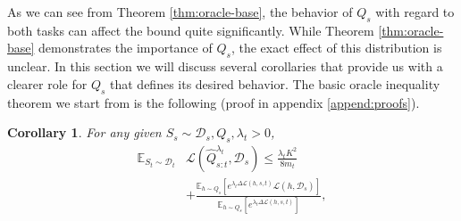 \documentclass{article}
\theoremstyle{plain}
\newtheorem{corollary}[theorem]{Corollary}
\theoremstyle{definition}
\theoremstyle{remark}
\begin{document}
 As we can see from Theorem \ref{thm:oracle-base}, the behavior of $Q_s$ with regard to both tasks can affect the bound quite significantly. 
 While Theorem \ref{thm:oracle-base} demonstrates the importance of $Q_s$, the exact effect of this distribution is unclear. In this section we will discuss several corollaries that provide us with a clearer role for $Q_s$ that defines its desired behavior.
 The basic oracle inequality theorem we start from is the following (proof in appendix \ref{append:proofs}).
%
\begin{corollary} \label{thm:oracle-logsum}
For any given $S_s\sim \mathcal{D}_s, Q_s, \lambda_t>0$, 
%
\begin{align} \label{eq:oracle-logsum}
\mathbb{E}_{S_t\sim \mathcal{D}_t}&\mathcal{L}( \hat{Q}^{\lambda_t}_{s:t},\mathcal{D}_s)\leq \frac{\lambda_t K^2}{8m_t}\\&+\frac{\mathbb{E}_{h\sim Q_s}\left [e^{\lambda_t\Delta \mathcal{L}(h,s,t)}\mathcal{L}(h,\mathcal{D}_s) \right ]}{\mathbb{E}_{h\sim Q_s}\left [e^{\lambda_t\Delta \mathcal{L}(h,s,t)}\right ]}, \nonumber
\end{align}
\end{corollary}


\end{document}
